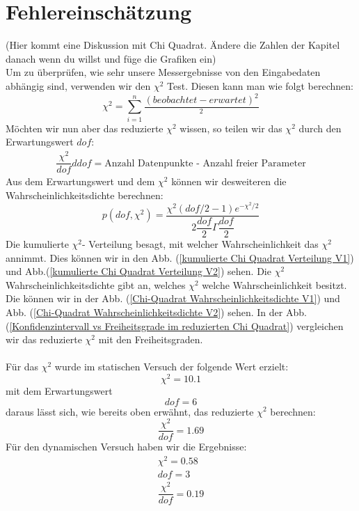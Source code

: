 \documentclass[bibliography=totocnumbered]{scrartcl}
\begin{document}
	\section{Fehlereinschätzung}
	(Hier kommt eine Diskussion mit Chi Quadrat. Ändere die Zahlen der Kapitel danach wenn du
	willst und füge die Grafiken ein)\\
	Um zu überprüfen, wie sehr unsere Messergebnisse von den Eingabedaten abhängig sind, verwenden wir den $ \chi^{2} $ Test. Diesen kann man wie folgt berechnen:
	\begin{equation}\label{eq: chi quadrattest}
		\chi^{2}=\sum_{i=1}^{n}\dfrac{(beobachtet-erwartet)^{2}}{^{2}}
	\end{equation}
	Möchten wir nun aber das reduzierte $ \chi^{2} $ wissen, so teilen wir das $ \chi^{2} $ durch den Erwartungswert $ dof $:
	\begin{align}
		\dfrac{\chi^{2}}{dof}
		ddof=\text{Anzahl Datenpunkte - Anzahl freier Parameter}
	\end{align}
	Aus dem Erwartungswert und dem $ \chi^{2} $ können wir desweiteren die Wahrscheinlichkeitsdichte berechnen:
	\begin{equation}\label{key}
		p(dof, \chi^{2})=\dfrac{\chi^{2}\left(dof/2-1\right)e^{-\chi^{2}/2}}{2\dfrac{dof}{2}\Gamma \dfrac{dof}{2}}
	\end{equation}
Die kumulierte $ \chi^{2} $- Verteilung besagt, mit welcher Wahrscheinlichkeit das $ \chi^{2} $ annimmt. Dies können wir in den Abb. (\ref{kumulierte Chi Quadrat Verteilung V1}) und Abb.(\ref{kumulierte Chi Quadrat Verteilung V2}) sehen. Die $ \chi^{2} $ Wahrscheinlichkeitsdichte gibt an, welches $ \chi^{2} $ welche Wahrscheinlichkeit besitzt. Die können wir in der Abb. (\ref{Chi-Quadrat Wahrscheinlichkeitsdichte V1}) und Abb. (\ref{Chi-Quadrat Wahrscheinlichkeitsdichte V2}) sehen.
In der Abb. (\ref{Konfidenzintervall vs Freiheitsgrade im reduzierten Chi Quadrat}) vergleichen wir das reduzierte $ \chi^{2} $ mit den Freiheitsgraden.\\
\\
Für das $ \chi^{2} $ wurde im statischen Versuch der folgende Wert erzielt:
\begin{equation}
	\chi^{2}=10.1
\end{equation}
mit dem Erwartungswert
\begin{equation} 
	dof=6
\end{equation}
daraus lässt sich, wie bereits oben erwähnt, das reduzierte $ \chi^{2} $ berechnen:
\begin{equation}
	\dfrac{\chi^{2}}{dof}=1.69
\end{equation}
Für den dynamischen Versuch haben wir die Ergebnisse:
\begin{align}
	\chi^{2}=0.58\\
	dof=3 \\
	\dfrac{\chi^{2}}{dof}=0.19
\end{align}
	
\end{document}

